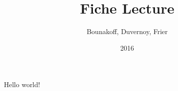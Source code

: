 \documentclass{article}
\title{Fiche Lecture}
\author{Bounakoff, Duvernoy, Frier}
\date{2016}
\begin{document}
	\maketitle
	Hello world!
\end{document}
